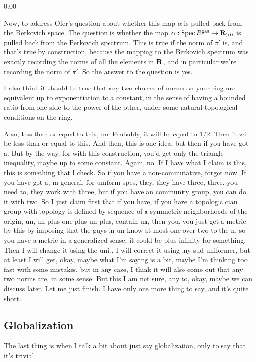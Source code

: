 \begin{unfinished}{0:00}
{Now, to address Ofer's question about whether this map $\alpha$ is pulled back from the Berkovich space. The question is whether the map $\alpha: \operatorname{Spec} R^{\mathrm{gas}} \to \mathbf R_{>0}$ is pulled back from the Berkovich spectrum. This is true if the norm of $\pi'$ is, and that's true by construction, because the mapping to the Berkovich spectrum was exactly recording the norms of all the elements in $\mathbf R$, and in particular we're recording the norm of $\pi'$. So the answer to the question is yes.

I also think it should be true that any two choices of norms on your ring are equivalent up to exponentiation to a constant, in the sense of having a bounded ratio from one side to the power of the other, under some natural topological conditions on the ring.

Also, less than or equal to this, no. Probably, it will be equal to 1/2. Then it will be less than or equal to this. And then, this is one idea, but then if you have got a. But by the way, for with this construction, you'd get only the triangle inequality, maybe up to some constant. Again, no. If I have what I claim is this, this is something that I check. So if you have a non-commutative, forgot now. If you have got a, in general, for uniform spes, they, they have three, three, you need to, they work with three, but if you have an community group, you can do it with two. So I just claim first that if you have, if you have a topologic cian group with topology is defined by sequence of a symmetric neighborhoods of the origin, un, un plus one plus un plus, contain un, then you, you just get a metric by this by imposing that the guys in un know at most one over two to the n, so you have a metric in a generalized sense, it could be plus infinity for something. Then I will change it using the unit, I will correct it using my sud uniformer, but at least I will get, okay, maybe what I'm saying is a bit, maybe I'm thinking too fast with some mistakes, but in any case, I think it will also come out that any two norms are, in some sense. But this I am not sure, any to, okay, maybe we can discuss later. Let me just finish. I have only one more thing to say, and it's quite short.

\subsection{Globalization}
The last thing is when I talk a bit about just say globalization, only to say that it's trivial. 

}
\end{unfinished}
